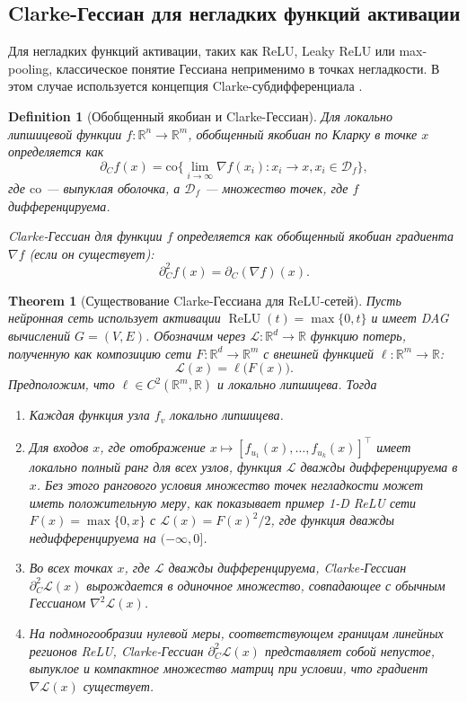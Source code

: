 \documentclass[11pt]{article}
\newtheorem{theorem}{Theorem}
\newtheorem{definition}{Definition}
\begin{document}
\subsection{Clarke-Гессиан для негладких функций активации}

Для негладких функций активации, таких как ReLU, Leaky ReLU или max-pooling, классическое понятие Гессиана
неприменимо в точках негладкости. В этом случае используется концепция Clarke-субдифференциала
\citep{clarke1990optimization}.

\begin{definition}[Обобщенный якобиан и Clarke-Гессиан]
  Для локально липшицевой функции $f: \mathbb{R}^n \to \mathbb{R}^m$, обобщенный якобиан по Кларку в точке
  $x$ определяется как
  \[
    \partial_C f(x) = \mathrm{co}\{\lim_{i\to\infty} \nabla f(x_i) : x_i \to x, x_i \in \mathcal{D}_f\},
  \]
  где $\mathrm{co}$ — выпуклая оболочка, а $\mathcal{D}_f$ — множество точек, где $f$ дифференцируема.

  Clarke-Гессиан для функции $f$ определяется как обобщенный якобиан градиента $\nabla f$ (если он существует):
  \[
    \partial_C^2 f(x) = \partial_C(\nabla f)(x).
  \]
\end{definition}

\begin{theorem}[Существование Clarke-Гессиана для ReLU-сетей]
  Пусть нейронная сеть использует активации $\operatorname{ReLU}(t)=\max\{0,t\}$
  и имеет DAG вычислений $G=(V,E)$.
  Обозначим через $\mathcal L:\mathbb R^{d}\to\mathbb R$ функцию потерь,
  полученную как композицию сети $F:\mathbb R^{d}\to\mathbb R^{m}$ с вне­шней
  функцией $\ell:\mathbb R^{m}\to\mathbb R$:
  \[
    \mathcal L(x)=\ell\bigl(F(x)\bigr).
  \]
  Предположим, что $\ell \in C^2(\mathbb{R}^m, \mathbb{R})$ и локально липшицева. Тогда

  \begin{enumerate}
    \item Каждая функция узла $f_v$ локально липшицева.
    \item Для входов $x$, где отображение $x \mapsto [f_{u_1}(x),\dots,f_{u_k}(x)]^{\!\top}$ имеет локально
      полный ранг для всех узлов, функция $\mathcal L$ дважды дифференцируема в $x$. Без этого рангового
      условия множество точек негладкости может иметь положительную меру, как показывает пример
      1-D ReLU сети $F(x)=\max\{0,x\}$ с $\mathcal L(x)=F(x)^2/2$, где функция дважды недифференцируема
      на $(-\infty,0]$.
    \item Во всех точках $x$, где $\mathcal L$ дважды дифференцируема,
      Clarke-Гессиан $\partial^2_C\mathcal L(x)$ вырождается в одиночное множество,
      совпадающее с обычным Гессианом $\nabla^{2}\mathcal L(x)$.
    \item На подмногообразии нулевой меры, соответствующем границам линейных регионов ReLU,
      Clarke-Гессиан $\partial^2_C\mathcal L(x)$ представляет собой
      непустое, выпуклое и компактное множество матриц при условии, что градиент $\nabla \mathcal L(x)$ существует.
  \end{enumerate}
\end{theorem}
\end{document}
